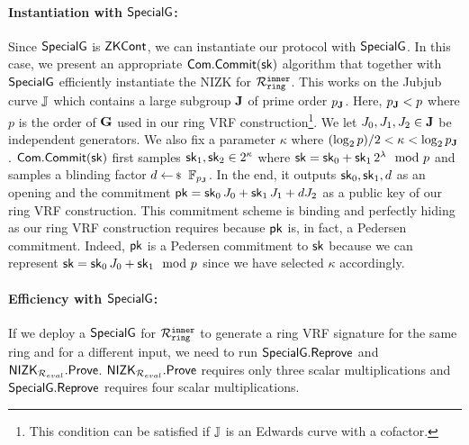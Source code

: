 \paragraph{Instantiation with $ {\mathsf{SpecialG}} $:} Since $ {\mathsf{SpecialG}} $ is $ {\mathsf{ZKCont}} $, we can instantiate our protocol with $ {\mathsf{SpecialG}}$. 
In this case, we present an appropriate $ \mathsf{Com}.\mathsf{Commit}(\mathsf{sk}) $ algorithm that together with $ {\mathsf{SpecialG}} $ efficiently instantiate the NIZK for $ \mathcal{R}_{\mathtt{ring}}^{\mathtt{inner}} $. This works on the Jubjub curve ${\mathbb{J}}$ which contains a large subgroup ${\mathbf{J}}$ of prime order $p_{\mathbf{J}}$. Here, $p_{\mathbf{J}} < p$ where $ p $ is the order of ${\mathbf{G}}$ used in our ring VRF construction\footnote{This condition can be satisfied if ${\mathbb{J}}$ is an Edwards curve with a cofactor.}. We let $J_0,J_1,J_2 \in {\mathbf{J}}$ be independent generators. We also fix a parameter $ \kappa $ where $(\log_2 p)/2 < \kappa < \log_2 p_{\mathbf{J}}$. $ \mathsf{Com}.\mathsf{Commit}(\mathsf{sk}) $ first samples $\mathsf{sk}_1,\mathsf{sk}_2 \in 2^\kappa$  where $\mathsf{sk} = \mathsf{sk}_0 + \mathsf{sk}_1 \, 2^{\lambda} \mod p$ and samples a blinding factor $d \leftsample \F_{p_\grJ} $. In the end, it outputs $ \mathsf{sk}_0, \mathsf{sk}_1,d $ as an opening and the commitment $\mathsf{pk}=\mathsf{sk}_0\, J_0 + \mathsf{sk}_1\, J_1 + d J_2$ as a public key of our ring VRF construction. This commitment scheme is binding and perfectly hiding as our ring VRF construction requires because $ \mathsf{pk} $ is, in fact, a Pedersen commitment. Indeed, $\mathsf{pk}$ is a Pedersen commitment to $\mathsf{sk}$ because we can represent $ \mathsf{sk} = \mathsf{sk}_0\, J_0 + \mathsf{sk}_1 \mod p$ since we have selected $ \kappa $ accordingly.

\paragraph{Efficiency with $ {\mathsf{SpecialG}} $:} If we deploy a ${\mathsf{SpecialG}}$  for $\mathcal{R}_{\mathtt{ring}}^{\mathtt{inner}}$
to generate a ring VRF signature for the same ring and for a different input, we need to run ${\mathsf{SpecialG}}.{\mathsf{Reprove}}$ and ${\mathsf{NIZK}}_{\mathcal{R}_{eval}}.{\mathsf{Prove}}$. ${\mathsf{NIZK}}_{\mathcal{R}_{eval}}.{\mathsf{Prove}}$ requires only three scalar multiplications and ${\mathsf{SpecialG}}.{\mathsf{Reprove}}$ requires four scalar multiplications.

